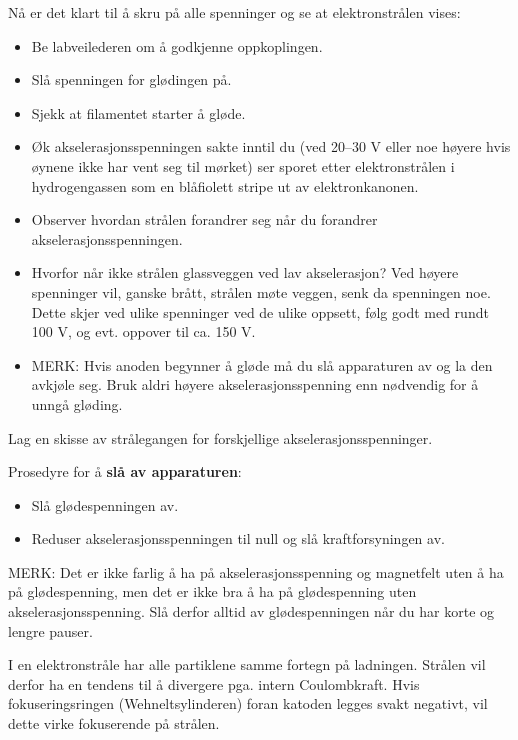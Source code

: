 \documentclass[../Elmag-labhefte-2020.tex]{subfiles}
\begin{document}
{\itsf Nå er det klart til å skru på alle spenninger og se at elektronstrålen vises:}
\vspace{-4mm} 
\begin{itemize}
\item Be labveilederen om å godkjenne oppkoplingen.
\item Slå spenningen for glødingen på.
\item Sjekk at filamentet starter å gløde.
\item Øk akselerasjonsspenningen sakte inntil du (ved 20--30 V eller noe høyere hvis øynene ikke har vent seg til mørket) ser 
sporet etter elektronstrålen i hydrogengassen som en blåfiolett stripe ut av elektronkanonen.
\item Observer hvordan strålen forandrer seg når du forandrer akselerasjonsspenningen.
\item Hvorfor når ikke strålen glassveggen ved lav akselerasjon? Ved høyere spenninger vil, ganske brått, strålen møte veggen, senk da spenningen noe. Dette skjer ved ulike spenninger ved de ulike oppsett, følg godt med rundt 100 V, og evt. oppover til ca. 150 V.
\item MERK: Hvis anoden begynner å gløde må du slå apparaturen av og la den avkjøle seg. Bruk aldri høyere akselerasjonsspenning enn nødvendig for å unngå gløding. 
\end{itemize}

{\itsf Lag en skisse av strålegangen for forskjellige akselerasjonsspenninger.}
%


Prosedyre for å \textbf{slå av apparaturen}:
\vspace{-4mm} 
\begin{itemize}
\item Slå glødespenningen av.
\item Reduser akselerasjonsspenningen til null og slå kraftforsyningen av. 
\end{itemize}
MERK: Det er ikke farlig å ha på akselerasjonsspenning og magnetfelt uten å ha på glødespenning, men det er ikke bra å ha på glødespenning uten akselerasjonsspenning. Slå derfor alltid av glødespenningen når du har korte og lengre pauser.

I en elektronstråle har alle partiklene samme fortegn på ladningen. Strålen vil derfor ha en tendens til å divergere pga. intern Coulombkraft. Hvis fokuseringsringen (Wehneltsylinderen) foran katoden legges svakt negativt, vil dette virke fokuserende på strålen. 
\end{document}
